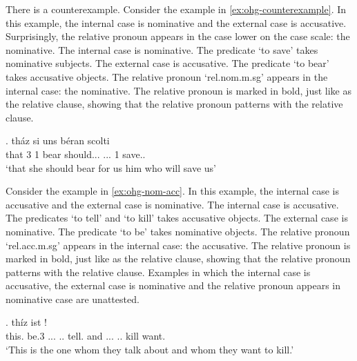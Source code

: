 There is a counterexample.
Consider the example in \ref{ex:ohg-counterexample}. In this example, the internal case is nominative and the external case is accusative. Surprisingly, the relative pronoun appears in the case lower on the case scale: the nominative.
The internal case is nominative. The predicate  `to save' takes nominative subjects.
The external case is accusative. The predicate  `to bear' takes accusative objects.
The relative pronoun  `\ac{rel}.\ac{nom}.\ac{m}.\ac{sg}' appears in the internal case: the nominative. The relative pronoun is marked in bold, just like as the relative clause, showing that the relative pronoun patterns with the relative clause.

\exg. tház si uns béran scolti   \\
 that 3 1 bear\scsub{[acc]} should... ... 1 save..\scsub{[nom]}\\
 `that she should bear for us him who will save us' \label{ex:ohg-counterexample}


Consider the example in \ref{ex:ohg-nom-acc}. In this example, the internal case is accusative and the external case is nominative.
The internal case is accusative. The predicates  `to tell' and  `to kill' takes accusative objects.
The external case is nominative. The predicate  `to be' takes nominative objects.
The relative pronoun  `\ac{rel}.\ac{acc}.\ac{m}.\ac{sg}' appears in the internal case: the accusative. The relative pronoun is marked in bold, just like as the relative clause, showing that the relative pronoun patterns with the relative clause.
Examples in which the internal case is accusative, the external case is nominative and the relative pronoun appears in nominative case are unattested.

\exg. thíz ist        !\\
this. be.3\scsub{[nom]} ... .. tell.\scsub{[acc]}
and ... .. kill\scsub{[acc]} want.\\
`This is the one whom they talk about and whom they want to kill.' \label{ex:ohg-nom-acc}

